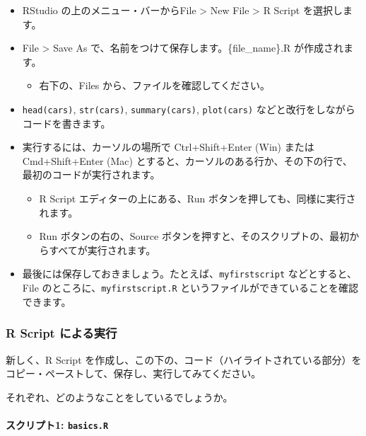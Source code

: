 \documentclass[
]{bxjsbook}
\providecommand{\tightlist}{%
  \setlength{\itemsep}{0pt}\setlength{\parskip}{0pt}}
\theoremstyle{definition}
\theoremstyle{definition}
\theoremstyle{definition}
\theoremstyle{definition}
\theoremstyle{remark}
\begin{document}
\begin{itemize}
\tightlist
\item
  RStudio の上のメニュー・バーからFile \textgreater{} New File \textgreater{} R Script を選択します。
\item
  File \textgreater{} Save As で、名前をつけて保存します。\{file\_name\}.R が作成されます。

  \begin{itemize}
  \tightlist
  \item
    右下の、Files から、ファイルを確認してください。
  \end{itemize}
\item
  \texttt{head(cars)}, \texttt{str(cars)}, \texttt{summary(cars)}, \texttt{plot(cars)} などと改行をしながらコードを書きます。
\item
  実行するには、カーソルの場所で Ctrl+Shift+Enter (Win) または Cmd+Shift+Enter (Mac) とすると、カーソルのある行か、その下の行で、最初のコードが実行されます。

  \begin{itemize}
  \tightlist
  \item
    R Script エディターの上にある、Run ボタンを押しても、同様に実行されます。
  \item
    Run ボタンの右の、Source ボタンを押すと、そのスクリプトの、最初からすべてが実行されます。
  \end{itemize}
\item
  最後には保存しておきましょう。たとえば、\texttt{myfirstscript} などとすると、File のところに、\texttt{myfirstscript.R} というファイルができていることを確認できます。
\end{itemize}

\hypertarget{r-script-ux306bux3088ux308bux5b9fux884c}{%
\subsubsection{R Script による実行}\label{r-script-ux306bux3088ux308bux5b9fux884c}}

新しく、R Script を作成し、この下の、コード（ハイライトされている部分）をコピー・ペーストして、保存し、実行してみてください。

それぞれ、どのようなことをしているでしょうか。

\hypertarget{ux30b9ux30afux30eaux30d7ux30c81-basics.r}{%
\paragraph{\texorpdfstring{スクリプト1: \texttt{basics.R}}{スクリプト1: basics.R}}\label{ux30b9ux30afux30eaux30d7ux30c81-basics.r}}
\end{document}
